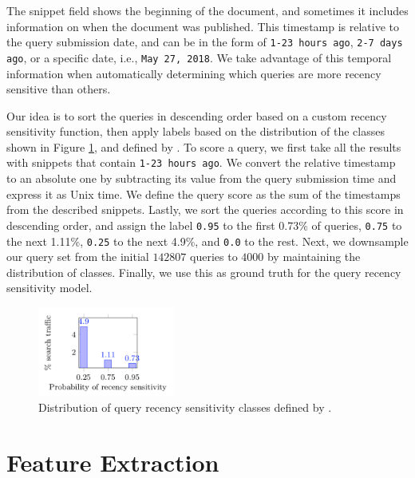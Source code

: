 The snippet field shows the beginning of the document, and sometimes it includes information on when the document was published. This timestamp is relative to the query submission date, and can be in the form of \texttt{1-23 hours ago}, \texttt{2-7 days ago}, or a specific date, i.e., \texttt{May 27, 2018}. We take advantage of this temporal information when automatically determining which queries are more recency sensitive than others.

Our idea is to sort the queries in descending order based on a custom recency sensitivity function, then apply labels based on the distribution of the classes shown in Figure \ref{fig:query_dis}, and defined by \citet{styskin2011recency}. To score a query, we first take all the results with snippets that contain \texttt{1-23 hours ago}. We convert the relative timestamp to an absolute one by subtracting its value from the query submission time and express it as Unix time. We define the query score as the sum of the timestamps from the described snippets. Lastly, we sort the queries according to this score in descending order, and assign the label \texttt{0.95} to the first 0.73\% of queries, \texttt{0.75} to the next 1.11\%, \texttt{0.25} to the next 4.9\%, and \texttt{0.0} to the rest. Next, we downsample our query set from the initial $142807$ queries to $4000$ by maintaining the distribution of classes. Finally, we use this as ground truth for the query recency sensitivity model.

\begin{figure}
  \centering
  \includegraphics[width=0.4\textwidth]{img/query_distribution.png}
  \caption{Distribution of query recency sensitivity classes defined by \citet{styskin2011recency}.}
  \label{fig:query_dis}
\end{figure}

\section{Feature Extraction}

